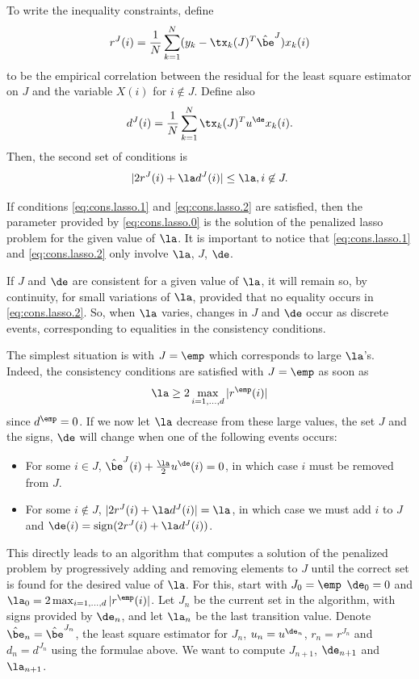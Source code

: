 To write the inequality constraints, define
$$
r^J(i) = \frac1N \sum_{k=1}^N (y_k - \tx_k(J)^T\hat\be^J) x_k(i)
$$
to be the empirical correlation between the residual for the least
square estimator on $J$ and the variable $X(i)$ for $i\not\in
J$. Define also
$$
d^J(i) = \frac{1}{N} \sum_{k=1}^N \tx_k(J)^Tu^\de x_k(i).
$$
Then, the second set of conditions is
\begin{equation}
\label{eq:cons.lasso.2}
|2r^J(i) + \la d^J(i)| \leq \la, i\not\in J.
\end{equation}

If conditions \eqref{eq:cons.lasso.1} and \eqref{eq:cons.lasso.2} are
satisfied, then the parameter provided by \eqref{eq:cons.lasso.0} is
the solution of the penalized lasso problem for the given value of
$\la$. It is important to notice that \eqref{eq:cons.lasso.1} and
\eqref{eq:cons.lasso.2} only involve $\la$, $J$, $\de$. 

If $J$ and $\de$ are consistent for a given value of $\la$, it will
remain so, by continuity, for small variations of $\la$, provided that no
equality occurs in \eqref{eq:cons.lasso.2}. So, when $\la$
varies, changes in $J$ and $\de$ occur as discrete
events, corresponding to equalities in the consistency conditions.


The simplest situation is with $J = \emp$ which corresponds
to large $\la$'s. Indeed, the consistency conditions are satisfied
with $J=\emp$ as soon as
$$
\la \geq 2\max_{i=1, \ldots, d} |r^\emp(i)|
$$
since $d^\emp = 0$. If we now let $\la$ decrease from these large
values, the set $J$ and the signs, $\de$ will change when one of the
following events occurs:
\begin{itemize}
\item[1.] For some $i\in J$, $\hat \be^J(i) + \frac\la2 u^\de(i) = 0$,
in which case $i$ must be removed from $J$.
\item[2.] For some $i\not\in J$, $|2r^J(i) + \la d^J(i)| = \la$, in which
case we must add $i$ to $J$ and 
$\de(i) = \mathrm{sign}(2r^J(i) + \la d^J(i))$.
\end{itemize}

This directly leads to an algorithm that computes a solution of the
penalized problem by progressively adding and removing elements to $J$
until the correct set is found for the desired value of $\la$. For
this, start with $J_0 = \emp$ $\de_0 = 0$ and $\la_0 = 2\max_{i=1, \ldots, d} |r^\emp(i)|$. Let $J_n$ be the current
set in the algorithm, with signs provided by $\de_n$, and let
$\la_{n}$ be the last transition value. Denote $\hat \be_n = \hat\be^{J_n}$, the least square
estimator for $J_n$, $u_n = u^{\de_n}$, $r_n = r^{J_n}$ and $d_n =
d^{J_n}$ using the formulae above.
We want to compute $J_{n+1}$,
$\de_{n+1}$  and $\la_{n+1}$. 

